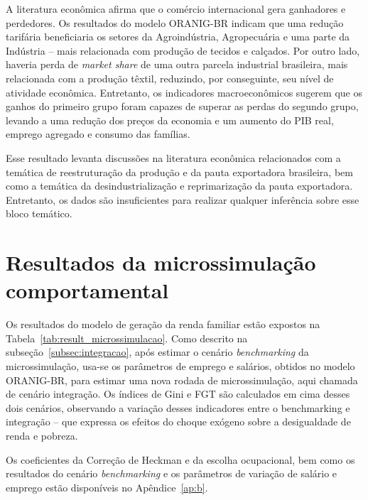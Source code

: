 A literatura econômica afirma que o comércio internacional gera ganhadores e perdedores. Os resultados do modelo ORANIG-BR indicam que uma redução tarifária beneficiaria os setores da Agroindústria, Agropecuária e uma parte da Indústria -- mais relacionada com produção de tecidos e calçados. Por outro lado, haveria perda de \textit{market share} de uma outra parcela industrial brasileira, mais relacionada com a produção têxtil, reduzindo, por conseguinte, seu nível de atividade econômica. Entretanto, os indicadores macroeconômicos sugerem que os ganhos do primeiro grupo foram capazes de superar as perdas do segundo grupo, levando a uma redução dos preços da economia e um aumento do PIB real, emprego agregado e consumo das famílias.

Esse resultado levanta discussões na literatura econômica relacionados com a temática de reestruturação da produção e da pauta exportadora brasileira, bem como a temática da desindustrialização e reprimarização da pauta exportadora. Entretanto, os dados são insuficientes para realizar qualquer inferência sobre esse bloco temático.



\section{Resultados da microssimulação comportamental} \label{sec:microssimulacao}

Os resultados do modelo de geração da renda familiar estão expostos na Tabela~\ref{tab:result_microssimulacao}. Como descrito na subseção~\ref{subsec:integracao}, após estimar o cenário \textit{benchmarking} da microssimulação, usa-se os parâmetros de emprego e salários, obtidos no modelo ORANIG-BR, para estimar uma nova rodada de microssimulação, aqui chamada de cenário integração. Os índices de Gini e FGT são calculados em cima desses dois cenários, observando a variação desses indicadores entre o benchmarking e integração -- que expressa os efeitos do choque exógeno sobre a desigualdade de renda e pobreza.

Os coeficientes da Correção de Heckman e da escolha ocupacional, bem como os resultados do cenário \textit{benchmarking} e os parâmetros de variação de salário e emprego estão disponíveis no Apêndice~\ref{ap:b}.

